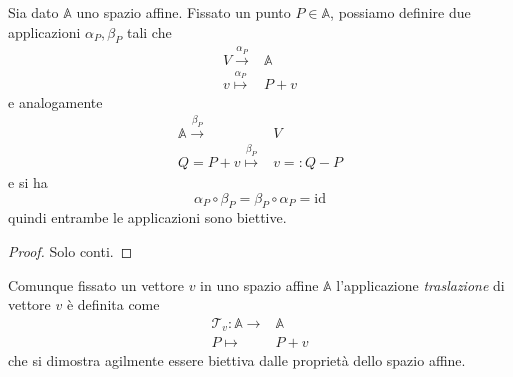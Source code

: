 \documentclass[11pt]{scrartcl}
\begin{document}
   	 \begin{proposition}
   	 	Sia dato $\mathbb{A}$ uno spazio affine. Fissato un punto $P\in \mathbb{A}$, possiamo definire due applicazioni $\alpha_P,\beta_P$ tali che
   	 	\begin{align*}
   	 		V\overset{\alpha_P}{\longrightarrow} & \mathbb{A} \\
   	 		v\overset{\alpha_P}{\longmapsto} & P+v
   	 	\end{align*}
   	 	e analogamente 
   	 	\begin{align*}
   	 		\mathbb{A}\overset{\beta_P}{\longrightarrow} & V \\
   	 		Q=P+v \overset{\beta_P}{\longmapsto} & v=:Q-P
   	 	\end{align*}
   	 	e si ha
   	 	$$\alpha_P\circ \beta_P=\beta_P\circ \alpha_P=\text{id}$$
   	 	quindi entrambe le applicazioni sono biettive.
   	 \end{proposition}
   	 \begin{proof}
   	 	Solo conti.
   	 \end{proof}
   	 
   	 \begin{definition}[Traslazione]
   	 	Comunque fissato un vettore $v$ in uno spazio affine $\mathbb{A}$ l'applicazione \textit{traslazione} di vettore $v$ è definita come
   	 	\begin{align*}
   	 		\mathcal{T}_v:\mathbb{A} \to & \mathbb{A} \\
   	 		P \mapsto & P+v
   	 	\end{align*}
   	 	che si dimostra agilmente essere biettiva dalle proprietà dello spazio affine.
   	 \end{definition}
   	 
\end{document}
